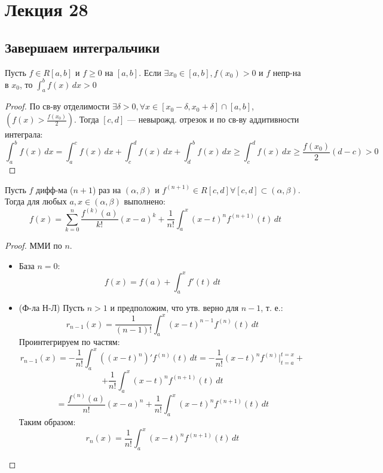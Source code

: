 \section{Лекция 28}
\subsection{Завершаем интегральчики}
\begin{note}
Пусть $f \in R[a, b]$ и $f \geq 0$ на $[a, b]$. Если $\exists x_0 \in [a, b], f(x_0) > 0$ и $f$ непр-на в $x_0$, то $\int_{a}^{b} f(x) \, dx > 0$
\end{note}
\begin{proof}
По св-ву отделимости $\exists \delta > 0, \forall x \in [x_0 - \delta, x_0 + \delta] \cap [a, b]$, $(f(x) > \frac{f(x_0)}{2})$. Тогда $[c, d]$ --- невырожд. отрезок и по св-ву аддитивности интеграла:
\[
\int_{a}^{b} f(x) \, dx = \int_{a}^{c} f(x) \, dx + \int_{c}^{d} f(x) \, dx + \int_{d}^{b} f(x) \, dx \geq \int_{c}^{d} f(x) \, dx \geq \frac{f(x_0)}{2}(d - c) > 0
\]
\end{proof}
\begin{theorem}
\label{th:last_taylor_element_in_integral_form(12)}
Пусть $f$ дифф-ма ($n + 1$) раз на $(\alpha, \beta)$ и $f^{(n + 1)} \in R[c, d] \forall [c, d] \subset (\alpha, \beta)$. Тогда для любых $a, x \in (\alpha, \beta)$ выполнено:
\[
f(x) = \sum_{k = 0}^{n} \frac{f^{(k)}(a)}{k!} (x - a)^{k} + \frac{1}{n!}\int_{a}^{x} (x - t)^{n}f^{(n + 1)}(t) \, dt
\]
\end{theorem}
\begin{proof}
ММИ по $n$.
\begin{itemize}
  \item База $n = 0$:
    \[
    f(x) = f(a) + \int_{a}^{x} f'(t) \, dt
    \]
  \item (Ф-ла Н-Л) Пусть $n > 1$ и предположим, что утв. верно для $n - 1$, т. е.:
    \[
    r_{n - 1}(x) = \frac{1}{(n - 1)!}\int_{a}^{x} (x - t)^{n - 1} f^{(n)}(t) \, dt
    \]
    Проинтегрируем по частям:
    \[
    r_{n - 1}(x) = -\frac{1}{n!}\int_{a}^{x} ((x - t)^{n})' f^{(n)}(t) \, dt = -\frac{1}{n!} (x - t)^{n}f^{(n)}|_{t = a}^{t = x} + 
    \]
    \[
     + \frac{1}{n!} \int_{a}^{x} (x - t)^{n}f^{(n + 1)}(t) \, dt
    \]
    \[
    = \frac{f^{(n)}(a)}{n!}(x - a)^{n} + \frac{1}{n!}\int_{a}^{x} (x - t)^{n} f^{(n + 1)}(t) \, dt
    \]
    Таким образом:
    \[
    r_n(x) = \frac{1}{n!} \int_{a}^{x} (x - t)^{n} f^{(n + 1)}(t) \, dt
    \]
\end{itemize}
\end{proof}
